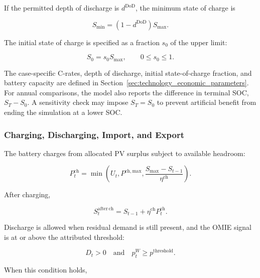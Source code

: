 If the permitted depth of discharge is $d^{\mathrm{DoD}}$, the minimum state of charge is

\begin{equation}
\label{eq:soc_min_from_dod}
S_{\min}=\left(1-d^{\mathrm{DoD}}\right)S_{\max}.
\end{equation}

The initial state of charge is specified as a fraction $s_0$ of the upper limit:

\begin{equation}
\label{eq:initial_soc}
S_0=s_0S_{\max}, \qquad 0\leq s_0\leq1.
\end{equation}

The case-specific C-rates, depth of discharge, initial state-of-charge fraction, and battery capacity are defined in Section~\ref{sec:technology_economic_parameters}. For annual comparisons, the model also reports the difference in terminal SOC, $S_T-S_0$. A sensitivity check may impose $S_T=S_0$ to prevent artificial benefit from ending the simulation at a lower SOC.

\subsubsection{Charging, Discharging, Import, and Export}
\label{subsec:community_surplus_import_export_self_consumption}

The battery charges from allocated PV surplus subject to available headroom:

\begin{equation}
\label{eq:charging_logic}
P^{\mathrm{ch}}_t=
\min\!\left(U_t,P^{\mathrm{ch,max}},
\frac{S_{\max}-S_{t-1}}{\eta^{\mathrm{ch}}}\right).
\end{equation}

After charging,

\begin{equation}
\label{eq:s_after_ch}
S^{\mathrm{after\,ch}}_t=S_{t-1}+\eta^{\mathrm{ch}}P^{\mathrm{ch}}_t.
\end{equation}

Discharge is allowed when residual demand is still present, and the OMIE signal is at or above the attributed threshold:

\begin{equation}
\label{eq:discharging_condition}
D_t>0 \quad \text{and} \quad p^W_t\geq p^{\mathrm{threshold}}.
\end{equation}

When this condition holds,

